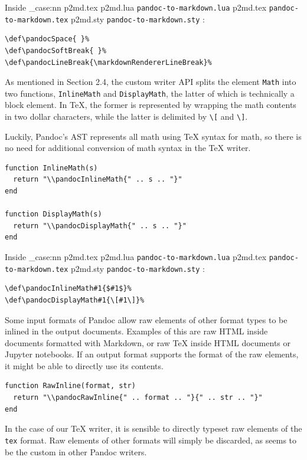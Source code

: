 \documentclass[
  digital,     %
  oneside,     %
  nosansbold,  %
  nocolorbold, %
  lof,         %
  nolot,       %
]{fithesis4}
\newcommand\file[1]
  {
    \str_case:nn
      { #1 }
      {
        { p2md.lua } { \texttt{pandoc\hyp{}to\hyp{}markdown.lua} }
        { p2md.tex } { \texttt{pandoc\hyp{}to\hyp{}markdown.tex} }
        { p2md.sty } { \texttt{pandoc\hyp{}to\hyp{}markdown.sty} }
      }
  }
\begin{document}
\noindent
Inside \file{p2md.tex}:

\noindent
\lstset{language=[plain]TeX}
\begin{lstlisting}
\def\pandocSpace{ }%
\def\pandocSoftBreak{ }%
\def\pandocLineBreak{\markdownRendererLineBreak}%
\end{lstlisting}

\noindent
As mentioned in Section 2.4, the custom writer API splits the element \texttt{Math} into two functions, \texttt{InlineMath} and \texttt{DisplayMath}, the latter of which is technically a block element. In \TeX{}, the former is represented by wrapping the math contents in two dollar characters, while the latter is delimited by \texttt{\textbackslash{}[} and \texttt{\textbackslash{}]}.

Luckily, Pandoc's AST represents all math using \TeX{} syntax for math, so there is no need for additional conversion of math syntax in the \TeX{} writer.

\noindent
\lstset{language=[5.3]Lua}
\begin{lstlisting}
function InlineMath(s)
  return "\\pandocInlineMath{" .. s .. "}"
end

function DisplayMath(s)
  return "\\pandocDisplayMath{" .. s .. "}"
end
\end{lstlisting}

\noindent
Inside \file{p2md.tex}:

\noindent
\lstset{language=[plain]TeX}
\begin{lstlisting}
\def\pandocInlineMath#1{$#1$}%
\def\pandocDisplayMath#1{\[#1\]}%
\end{lstlisting}

\noindent
Some input formats of Pandoc allow raw elements of other format types to be inlined in the output documents. Examples of this are raw HTML inside documents formatted with Markdown, or raw \TeX{} inside HTML documents or Jupyter notebooks. If an output format supports the format of the raw elements, it might be able to directly use its contents.

\noindent
\lstset{language=[5.3]Lua}
\begin{lstlisting}
function RawInline(format, str)
  return "\\pandocRawInline{" .. format .. "}{" .. str .. "}"
end
\end{lstlisting}

\noindent
In the case of our \TeX{} writer, it is sensible to directly typeset raw elements of the \texttt{tex} format. Raw elements of other formats will simply be discarded, as seems to be the custom in other Pandoc writers.
\end{document}
